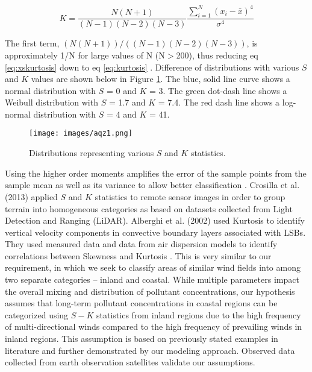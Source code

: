 \begin{equation}
\label{eq:xskurtosis}
K = \frac{N(N+1)}{(N-1)(N-2)(N-3)} \frac{\sum_{i=1}^{N}\left (x_{i}-\bar{x} \right )^{4}}{\sigma^{4}}
\end{equation}

The first term, $(N(N+1))/((N-1)(N-2)(N-3))$, is approximately 1/N for large values of N (N$>$200), thus reducing eq \ref{eq:xskurtosis} down to eq \ref{eq:kurtosis} \citep{Cox2010}.  Difference of distributions with various $S$ and $K$ values are shown below in Figure \ref{fig:SKcurves}.  The blue, solid line curve shows a normal distribution with $S$ = 0 and $K$ = 3. The green dot-dash line shows a Weibull distribution with $S$ = 1.7 and $K$ = 7.4.  The red dash line shows a log-normal distribution with $S$ = 4 and $K$ = 41. 
%
\begin{figure}
\texttt{[image: images/aqz1.png]} 
\caption{Distributions representing various $S$ and $K$ statistics.}
\label{fig:SKcurves}
\end{figure}
%
Using the higher order moments amplifies the error of the sample points from the sample mean as well as its variance to allow better classification \citep{Seo2011}.  Crosilla et al. (2013) applied $S$ and $K$ statistics to remote sensor images in order to group terrain into homogeneous categories as based on datasets collected from Light Detection and Ranging (LiDAR).  Alberghi et al. (2002) used Kurtosis to identify vertical velocity components in convective boundary layers associated with LSBs.  They used measured data and data from air dispersion models to identify correlations between Skewness and Kurtosis \citep{Alberghi2002}.  This is very similar to our requirement, in which we seek to classify areas of similar wind fields into among two separate categories – inland and coastal.  While multiple parameters impact the overall mixing and distribution of pollutant concentrations, our hypothesis assumes that long-term pollutant concentrations in coastal regions can be categorized using $S-K$ statistics from inland regions due to the high frequency of multi-directional winds compared to the high frequency of prevailing winds in inland regions.  This assumption is based on previously stated examples in literature and further demonstrated by our modeling approach.  Observed data collected from earth observation satellites validate our assumptions.

